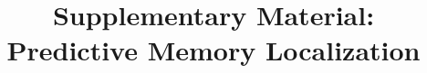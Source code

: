 \documentclass{article}
\title{Supplementary Material: Predictive Memory Localization}
\begin{document}
\maketitle
\suppressfloats[t]

\appendix
\renewcommand{\thesection}{S\arabic{section}}
\renewcommand{\thesubsection}{S\arabic{section}.\arabic{subsection}}
\renewcommand{\thetable}{S\arabic{table}}
\renewcommand{\thefigure}{S\arabic{figure}}
\renewcommand{\theequation}{S\arabic{equation}}





\end{document}
